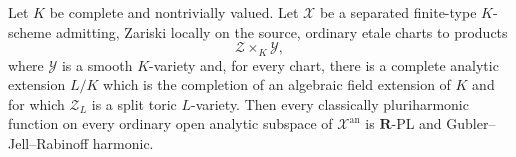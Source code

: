 
\begin{corollary}
\label{cor:p061-zariski-etale-algebraic-split-toric-charts}
Let \(K\) be complete and nontrivially valued.  Let \(\mathcal X\) be a
separated finite-type \(K\)-scheme admitting, Zariski locally on the
source, ordinary etale charts to products
\[
                         \mathcal Z\times_K\mathcal Y,
\]
where \(\mathcal Y\) is a smooth \(K\)-variety and, for every chart, there
is a complete analytic extension \(L/K\) which is the completion of an
algebraic field extension of \(K\) and for which \(\mathcal Z_L\) is a
split toric \(L\)-variety.  Then every classically pluriharmonic function
on every ordinary open analytic subspace of \(\mathcal X^{\mathrm{an}}\)
is \(\mathbf R\)-PL and Gubler--Jell--Rabinoff harmonic.
\end{corollary}
